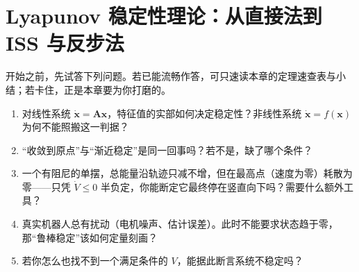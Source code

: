 \chapter{Lyapunov 稳定性理论：从直接法到 ISS 与反步法}
\label{ch:lyapunov-stability}


\begin{practice}[前置自测]
开始之前，先试答下列问题。若已能流畅作答，可只速读本章的定理速查表与小结；若卡住，正是本章要为你打磨的。
\begin{enumerate}
  \item 对线性系统 $\dot{\mathbf{x}}=\mathbf{A}\mathbf{x}$，特征值的实部如何决定稳定性？非线性系统 $\dot{\mathbf{x}}=f(\mathbf{x})$ 为何不能照搬这一判据？
  \item “收敛到原点”与“渐近稳定”是同一回事吗？若不是，缺了哪个条件？
  \item 一个有阻尼的单摆，总能量沿轨迹只减不增，但在最高点（速度为零）耗散为零——只凭 $\dot V\le 0$ 半负定，你能断定它最终停在竖直向下吗？需要什么额外工具？
  \item 真实机器人总有扰动（电机噪声、估计误差）。此时不能要求状态趋于零，那“鲁棒稳定”该如何定量刻画？
  \item 若你怎么也找不到一个满足条件的 $V$，能据此断言系统不稳定吗？
\end{enumerate}
\end{practice}

